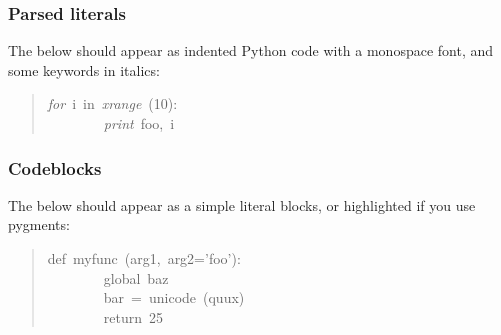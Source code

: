 \documentclass[t]{beamer}
\begin{document}
\begin{frame}[fragile]
\frametitle{Parsed literals}


The below should appear as indented Python code with a monospace font, and
some keywords in italics:
%
\begin{quote}{\ttfamily \raggedright \noindent
\emph{for}~i~in~\emph{xrange}~(10):\\
~~~~~~~~\emph{print}~\textquotedbl{}foo\textquotedbl{},~i
}
\end{quote}

\end{frame}

\begin{frame}[fragile]
\frametitle{Codeblocks}


The below should appear as a simple literal blocks, or highlighted if you use pygments:
%
\begin{quote}{\ttfamily \raggedright \noindent
def~myfunc~(arg1,~arg2='foo'):\\
~~~~~~~~global~baz\\
~~~~~~~~bar~=~unicode~(quux)\\
~~~~~~~~return~25
}
\end{quote}

\end{frame}
\end{document}
